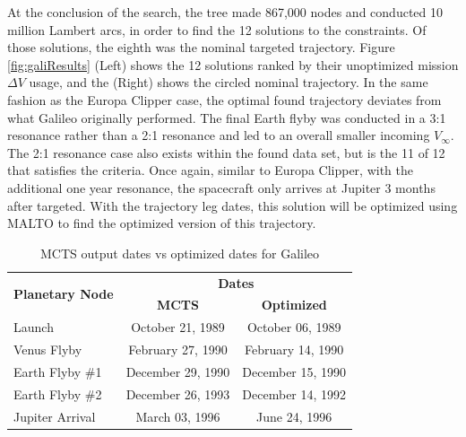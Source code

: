 \documentclass[letterpaper, preprint, paper,11pt]{AAS}	%
\begin{document}
At the conclusion of the search, the tree made 867,000 nodes and conducted 10 million Lambert arcs, in order to find the 12 solutions to the constraints. Of those solutions, the eighth was the nominal targeted trajectory. Figure \ref*{fig:galiResults} (Left) shows the 12 solutions ranked by their unoptimized mission $\Delta V$ usage, and the (Right) shows the circled nominal trajectory. In the same fashion as the Europa Clipper case, the optimal found trajectory deviates from what Galileo originally performed. The final Earth flyby was conducted in a 3:1 resonance rather than a 2:1 resonance and led to an overall smaller incoming $V_\infty$. The 2:1 resonance case also exists within the found data set, but is the 11 of 12 that satisfies the criteria. Once again, similar to Europa Clipper, with the additional one year resonance, the spacecraft only arrives at Jupiter 3 months after targeted. With the trajectory leg dates, this solution will be optimized using MALTO to find the optimized version of this trajectory.
\begin{table}[htb]
    \begin{center}
        \caption{MCTS output dates vs optimized dates for Galileo}
        \label{table:galiMInputs}
        \begin{tabular}{lcc}
            \toprule
            \multirow{2}{*}{\textbf{Planetary Node}} & \multicolumn{2}{c}{\textbf{Dates}}\\
            \cmidrule{2-3}
            {} & \textbf{MCTS} & \textbf{Optimized}\\
            \midrule
            Launch          & October 21, 1989  & October 06, 1989\\
            Venus Flyby     & February 27, 1990 & February 14, 1990 \\
            Earth Flyby \#1 & December 29, 1990 & December 15, 1990 \\
            Earth Flyby \#2 & December 26, 1993 & December 14, 1992 \\
            Jupiter Arrival & March 03, 1996    & June 24, 1996 \\
            \bottomrule
        \end{tabular}
    \end{center}
\end{table}
\end{document}

